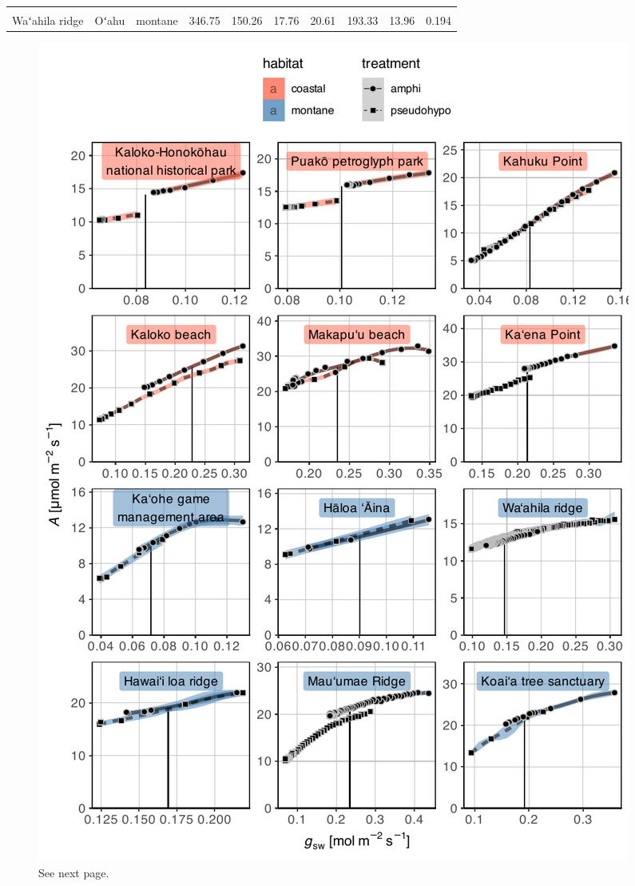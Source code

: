 \documentclass[
  letterpaper,
  DIV=11,
  numbers=noendperiod]{scrartcl}
\begin{document}
\begin{landscape}
\begin{longtable}{>{\raggedright\arraybackslash}p{4cm}>{\raggedright\arraybackslash}p{1.5cm}>{\raggedright\arraybackslash}p{1.5cm}rrrrrrr}
\addlinespace
\cellcolor{gray!6}{Mauʻumae Ridge} & \cellcolor{gray!6}{Oʻahu} & \cellcolor{gray!6}{montane} & \cellcolor{gray!6}{298.77} & \cellcolor{gray!6}{138.32} & \cellcolor{gray!6}{16.53} & \cellcolor{gray!6}{20.72} & \cellcolor{gray!6}{162.02} & \cellcolor{gray!6}{24.60} & \cellcolor{gray!6}{0.436}\\
Waʻahila ridge & Oʻahu & montane & 346.75 & 150.26 & 17.76 & 20.61 & 193.33 & 13.96 & 0.194\\
\bottomrule
\end{longtable}
\end{landscape}

\newpage

\begin{figure}
  \includegraphics{../figures/licor.pdf}
  \caption{See next page.}
  \label{fig:licor}
\end{figure}

\newpage
\end{document}
